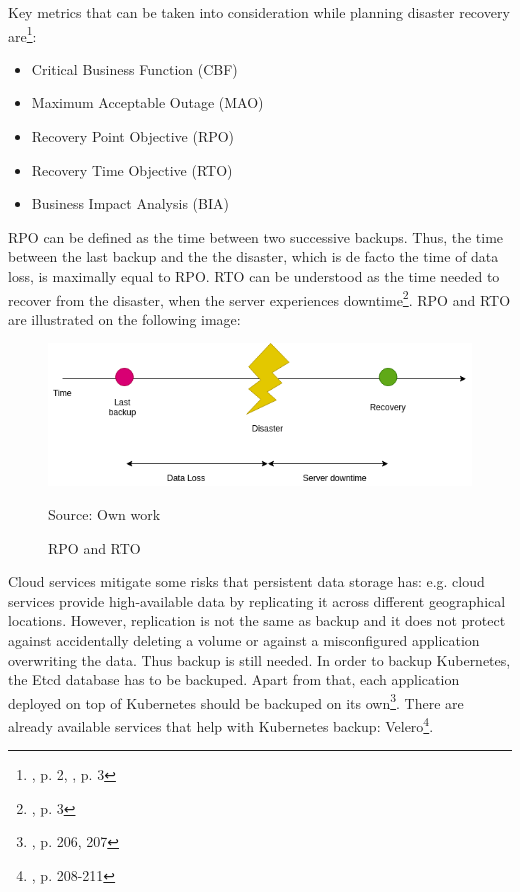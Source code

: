 Key metrics that can be taken into consideration while planning disaster recovery are\footnote{\cite{article-dr}, p. 2, \cite{article-dr-cloud}, p. 3}:
\begin{itemize}
\item Critical Business Function (CBF)
\item Maximum Acceptable Outage (MAO)
\item Recovery Point Objective (RPO)
\item Recovery Time Objective (RTO)
\item Business Impact Analysis (BIA)
\end{itemize}
RPO can be defined as the time between two successive backups. Thus, the time between the last backup and the the disaster, which is de facto the time of data loss, is maximally equal to RPO. RTO can be understood as the time needed to recover from the disaster, when the server experiences downtime\footnote{\cite{article-dr-cloud}, p. 3}. RPO and RTO are illustrated on the following image:
\begin{figure}[H]
    \centering
    \includegraphics[width=13cm]{figures/rpo-rto.png}
    \label{fig:rpo-rto}
    \caption{RPO and RTO}
    \small{Source: Own work}
\end{figure}

Cloud services mitigate some risks that persistent data storage has: e.g. cloud services provide high-available data by replicating it across different geographical locations. However, replication is not the same as backup and it does not protect against accidentally deleting a volume or against a misconfigured application overwriting the data. Thus backup is still needed. In order to backup Kubernetes, the Etcd database has to be backuped. Apart from that, each application deployed on top of Kubernetes should be backuped on its own\footnote{\cite{book-cndwk}, p. 206, 207}. There are already available services that help with Kubernetes backup: Velero\footnote{\cite{book-cndwk}, p. 208-211}.


